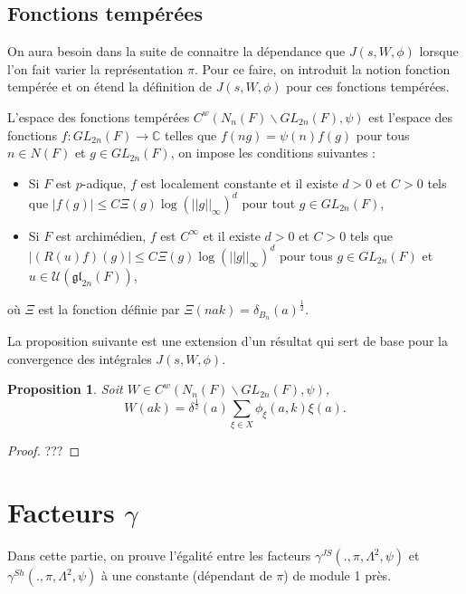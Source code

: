 \documentclass{amsart}
\newtheorem{proposition}{Proposition}[section]
\begin{document}
 \subsection{Fonctions tempérées}
 On aura besoin dans la suite de connaitre la dépendance que $J(s, W, \phi)$ lorsque l'on fait varier la représentation $\pi$. Pour ce faire, on introduit la notion fonction tempérée et on étend la définition de $J(s,W,\phi)$ pour ces fonctions tempérées.
 
 L'espace des fonctions tempérées $C^w(N_n(F)\backslash{GL_{2n}(F)}, \psi)$ est l'espace des fonctions $f : GL_{2n}(F) \rightarrow \mathbb{C}$ telles que $f(ng) = \psi(n)f(g)$ pour tous $n \in N(F)$ et $g \in GL_{2n}(F)$, on impose les conditions suivantes :
 \begin{itemize}
 \item Si $F$ est $p$-adique, $f$ est localement constante et il existe $d > 0$ et $C > 0$ tels que $|f(g)| \leq C \Xi(g)\log(||g||_\infty)^d$ pour tout $g \in GL_{2n}(F)$,
 \item Si $F$ est archimédien, $f$ est $C^\infty$ et il existe $d > 0$ et $C > 0$ tels que $|(R(u)f)(g)| \leq C \Xi(g) \log(||g||_\infty)^d$ pour tous $g \in GL_{2n}(F)$ et $u \in \mathcal{U}(\mathfrak{gl}_{2n}(F))$,
 \end{itemize}
 où $\Xi$ est la fonction définie par $\Xi(nak) = \delta_{B_n}(a)^{\frac{1}{2}}$.
 
 La proposition suivante est une extension d'un résultat qui sert de base pour la convergence des intégrales $J(s, W, \phi)$.
 \begin{proposition}
 Soit $W \in C^w(N_n(F)\backslash{GL_{2n}(F)}, \psi)$,
 \begin{equation}
 W(ak) = \delta^{\frac{1}{2}}(a) \sum_{\xi \in X} \phi_\xi(a,k)\xi(a).
 \end{equation}
 \end{proposition}
 
 \begin{proof}
 ???
 \end{proof}
 
 \section{Facteurs $\gamma$}
 
 Dans cette partie, on prouve l'égalité entre les facteurs $\gamma^{JS}(., \pi, \Lambda^2, \psi)$ et $\gamma^{Sh}(., \pi, \Lambda^2, \psi)$ à une constante (dépendant de $\pi$) de module 1 près.
 
\end{document}
